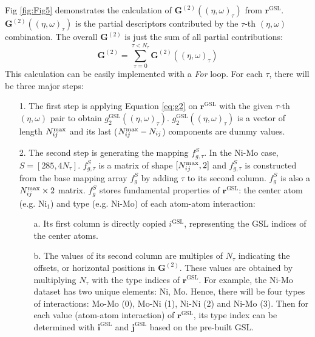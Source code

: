 \documentclass[final,1p,times]{elsarticle}
\begin{document}
Fig \ref{fig:Fig5} 
demonstrates the calculation of $\mathbf{G}^{(2)}((\eta, \omega)_{\tau})$ from 
$\mathbf{r}^{\mathrm{GSL}}$. $\mathbf{G}^{(2)}((\eta, \omega)_{\tau})$ is the 
partial descriptors contributed by the $\tau$-th $(\eta, \omega)$ combination.
The overall $\mathbf{G}^{(2)}$ is just the sum of all partial contributions:
\begin{equation}
\mathbf{G}^{(2)} = \sum_{\tau=0}^{\tau < N_{\tau}}{
    \mathbf{G}^{(2)}((\eta, \omega)_{\tau})
}
\end{equation}
This calculation can be easily implemented with a \textit{For} loop. For each 
$\tau$, there will be three major steps:

\begin{itemize}
    
    \item[1.]
    The first step is applying Equation \ref{eq:g2} on 
    $\mathbf{r}^{\mathrm{GSL}}$ with the given $\tau$-th $(\eta, \omega)$ pair 
    to obtain $g^{\mathrm{GSL}}_{2}((\eta, \omega)_{\tau})$. 
    $g^{\mathrm{GSL}}_{2}((\eta, \omega)_{\tau})$ is a vector of length 
    $N_{ij}^{\mathrm{max}}$ and its last ($N_{ij}^{\mathrm{max}} - N_{ij}$) components are dummy values.
    
    \item[2.]
    The second step is generating the mapping $f_{g,\tau}^{S}$. In the Ni-Mo 
    case, $S=[285, 4N_{\tau}]$. $f_{g,\tau}^{S}$ is a matrix of shape 
    $[N_{ij}^{\mathrm{max}}, 2]$ and $f_{g,\tau}^{S}$ is constructed from the base mapping 
    array $f_{g}^{S}$ by adding $\tau$ to its second column. $f_{g}^{S}$ is also
    a $N_{ij}^{\mathrm{max}} \times 2$ matrix. $f_{g}^{S}$ stores fundamental properties of 
    $\mathbf{r}^{\mathrm{GSL}}$: the center atom (e.g. $\mathrm{Ni}_{1}$) and 
    type (e.g. Ni-Mo) of each atom-atom interaction:
    \begin{itemize}

        \item[a.] 
        Its first column is directly copied $i^{\mathrm{GSL}}$, representing the 
        GSL indices of the center atoms.
        
        \item[b.] 
        The values of its second column are multiples of $N_{\tau}$ indicating 
        the offsets, or horizontal positions in $\mathbf{G}^{(2)}$. These values 
        are obtained by multiplying $N_{\tau}$ with the type indices of 
        $\mathbf{r}^{\mathrm{GSL}}$. For example, the Ni-Mo dataset has two 
        unique elements: Ni, Mo. Hence, there will be four types of interactions:
        Mo-Mo (0), Mo-Ni (1), Ni-Ni (2) and Ni-Mo (3). Then for each value 
        (atom-atom interaction) of $\mathbf{r}^{\mathrm{GSL}}$, its type index 
        can be determined with $\mathbf{i}^{\mathrm{GSL}}$ and 
        $\mathbf{j}^{\mathrm{GSL}}$ based on the pre-built GSL.


\end{itemize}
\end{itemize}
\end{document}
